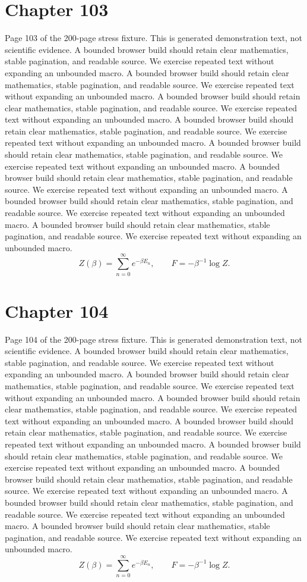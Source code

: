 \documentclass[11pt]{article}
\begin{document}
\section*{Chapter 103}
Page 103 of the 200-page stress fixture. This is generated demonstration text, not scientific evidence.
A bounded browser build should retain clear mathematics, stable pagination, and readable source. We exercise repeated text without expanding an unbounded macro.
A bounded browser build should retain clear mathematics, stable pagination, and readable source. We exercise repeated text without expanding an unbounded macro.
A bounded browser build should retain clear mathematics, stable pagination, and readable source. We exercise repeated text without expanding an unbounded macro.
A bounded browser build should retain clear mathematics, stable pagination, and readable source. We exercise repeated text without expanding an unbounded macro.
A bounded browser build should retain clear mathematics, stable pagination, and readable source. We exercise repeated text without expanding an unbounded macro.
A bounded browser build should retain clear mathematics, stable pagination, and readable source. We exercise repeated text without expanding an unbounded macro.
A bounded browser build should retain clear mathematics, stable pagination, and readable source. We exercise repeated text without expanding an unbounded macro.
A bounded browser build should retain clear mathematics, stable pagination, and readable source. We exercise repeated text without expanding an unbounded macro.
\[Z(\beta)=\sum_{n=0}^{\infty}e^{-\beta E_n},\qquad F=-\beta^{-1}\log Z.\]
\newpage
\section*{Chapter 104}
Page 104 of the 200-page stress fixture. This is generated demonstration text, not scientific evidence.
A bounded browser build should retain clear mathematics, stable pagination, and readable source. We exercise repeated text without expanding an unbounded macro.
A bounded browser build should retain clear mathematics, stable pagination, and readable source. We exercise repeated text without expanding an unbounded macro.
A bounded browser build should retain clear mathematics, stable pagination, and readable source. We exercise repeated text without expanding an unbounded macro.
A bounded browser build should retain clear mathematics, stable pagination, and readable source. We exercise repeated text without expanding an unbounded macro.
A bounded browser build should retain clear mathematics, stable pagination, and readable source. We exercise repeated text without expanding an unbounded macro.
A bounded browser build should retain clear mathematics, stable pagination, and readable source. We exercise repeated text without expanding an unbounded macro.
A bounded browser build should retain clear mathematics, stable pagination, and readable source. We exercise repeated text without expanding an unbounded macro.
A bounded browser build should retain clear mathematics, stable pagination, and readable source. We exercise repeated text without expanding an unbounded macro.
\[Z(\beta)=\sum_{n=0}^{\infty}e^{-\beta E_n},\qquad F=-\beta^{-1}\log Z.\]
\newpage
\end{document}
